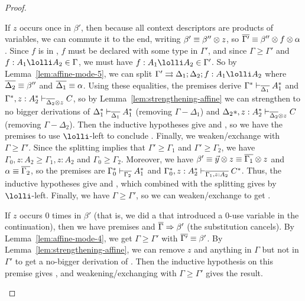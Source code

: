 \begin{proof}
\begin{itemize}
  If $z$ occurs once in $\beta'$, then because all context descriptors
  are products of variables, we can commute it to the end, writing
  $\beta' \equiv \beta'' \otimes z$, so $\overline{\Gamma'} \equiv \beta''
  \otimes f \otimes \alpha$.  Since $f$ is in , $f$ must
  be declared with some type in $\Gamma'$, and since $\Gamma \ge
  \Gamma'$ and $f:A_1 \lolli A_2 \in \Gamma$, we must have $f:A_1 \lolli
  A_2 \in \Gamma'$.  So by Lemma~\ref{lem:affine-mode-5}, we can split
  $\Gamma' \splits \Delta_1;\Delta_2;f:A_1 \lolli A_2$ where
  $\overline{\Delta_2} \equiv \beta''$ and $\overline{\Delta_1} \equiv \alpha$.
  Using these equalities, the premises derive
  $\Gamma^* \vdash_{\overline{\Delta_1}} A_1^*$ and
  $\Gamma^*,z:A_2^* \vdash_{\overline{\Delta_2} \otimes z} C$, so by
  Lemma~\ref{lem:strengthening-affine} we can strengthen to no bigger
  derivations of
  $\Delta_1^* \vdash_{\overline{\Delta_1}} A_1^*$ (removing $\Gamma-\Delta_1$) and
  $\Delta_2*,z:A_2^* \vdash_{\overline{\Delta_2} \otimes z} C$ (removing $\Gamma-\Delta_2$).
  Then the inductive hypotheses give  and
  , so we have the premises to use $\lolli$-left
  to conclude .  Finally, we weaken/exchange with
  $\Gamma \ge \Gamma'$.
  Since the splitting implies that $\Gamma' \ge \Gamma_1$ and $\Gamma'
  \ge \Gamma_2$, we have $\Gamma_0,z:A_2 \ge \Gamma_1,z:A_2$ and
  $\Gamma_0 \ge \Gamma_2$.  Moreover, we have $\beta' \equiv \vec{y}
  \otimes z \equiv \overline{\Gamma_1} \otimes z$ and $\alpha \equiv
  \overline{\Gamma_2}$, so the premises are
  $\Gamma_0^* \vdash_{\overline{\Gamma_2}} A_1^*$ and
  $\Gamma_0^*,z:A_2^* \vdash_{\overline{\Gamma_1,z:A_2}} C^*$.  Thus, the
  inductive hypotheses give  and
  , which combined with the splitting gives
   by $\lolli$-left.  Finally, we have $\Gamma \ge
  \Gamma'$, so we can weaken/exchange to get .

  If $z$ occurs 0 times in $\beta'$ (that is, we did a \UL\/ that
  introduced a 0-use variable in the continuation), then we have
  premises  and $\overline{\Gamma} \Rightarrow
  \beta'$ (the substitution cancels).  By Lemma~\ref{lem:affine-mode-4},
  we get $\Gamma \ge \Gamma'$ with $\overline{\Gamma'} \equiv \beta'$.  By
  Lemma~\ref{lem:strengthening-affine}, we can remove $z$ and anything
  in $\Gamma$ but not in $\Gamma'$ to get a no-bigger derivation of
  .  Then the inductive hypothesis on
  this premise gives , and weakening/exchanging with
  $\Gamma \ge \Gamma'$ gives the result.

\end{itemize}


















\end{proof}
